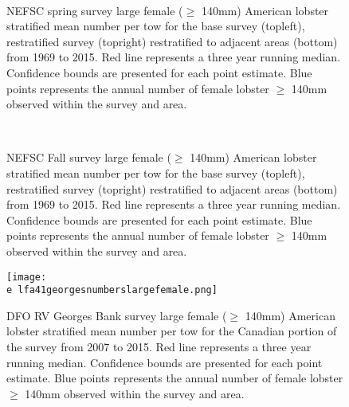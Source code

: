 \documentclass[11pt]{article}
\newcommand{\e}{/backup/bio_data/bio.lobster/figures/} %
\begin{document}
\begin{figure}
\centering
{}
\\
\caption{NEFSC spring survey large female ($\geq$ 140mm) American lobster stratified mean number per tow for the base survey (topleft), restratified survey (topright) restratified to adjacent areas (bottom) from 1969 to 2015. Red line represents a three year running median. Confidence bounds are presented for each point estimate. Blue points represents the annual number of female lobster $\geq$ 140mm observed within the survey and area.}
\end{figure}
\clearpage


\begin{figure}
\centering
{}
\\
\caption{NEFSC Fall survey large female ($\geq$ 140mm) American lobster stratified mean number per tow for the base survey (topleft), restratified survey (topright) restratified to adjacent areas (bottom) from 1969 to 2015. Red line represents a three year running median. Confidence bounds are presented for each point estimate. Blue points represents the annual number of female lobster $\geq$ 140mm observed within the survey and area.}
\end{figure}
\clearpage

\begin{figure}

    \texttt{[image: \\e lfa41georgesnumberslargefemale.png]}
    \caption{DFO RV Georges Bank survey large female ($\geq$ 140mm) American lobster stratified mean number per tow for the Canadian portion of the survey from 2007 to 2015. Red line represents a three year running median. Confidence bounds are presented for each point estimate. Blue points represents the annual number of female lobster $\geq$ 140mm observed within the survey and area.}

\end{figure}
\end{document}
